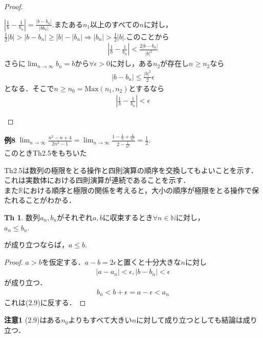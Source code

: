 \documentclass{ltjsarticle}
\theoremstyle{definition}
\newtheorem{thm}{Th}[subsection]
\theoremstyle{propcorollarystyle}
\theoremstyle{thmcorollarystyle}
\begin{document}
\begin{proof}
\begin{enumerate}[label={\arabic*}),itemsep=1em]
    $|\frac{1}{b}-\frac{1}{b_n}|=\frac{|b-b_n|}{|bb_n|}.$またある$n_1$以上のすべての$n$に対し，
    $\frac{1}{2}|b|>|b-b_n| \ge |b|-|b_n| \Rightarrow |b_n| > \frac{1}{2}|b|.$このことから
    \begin{align*}
      |\frac{1}{b}-\frac{1}{b_n}|<\frac{2|b-b_n|}{|b|^2}
    \end{align*} 
    さらに$\lim_{n \rightarrow \infty} b_n=b$から$\forall \epsilon>0$に対し，ある$n_2$が存在し$n \ge n_2$なら
    \begin{align*}
      |b-b_n| \le \frac{|b|^2}{2}\epsilon
    \end{align*}
    となる．そこで$n \ge n_0=\text{Max}{(n_1,n_2)}$とするなら
    \begin{align*}
      |\frac{1}{b}-\frac{1}{b_n}|<\epsilon
    \end{align*}
  \end{enumerate}
\end{proof}

\textbf{例8} $\lim_{n \rightarrow \infty} \frac{n^2 -n+4}{2n^2 -1}=
\lim_{n \rightarrow \infty} \frac{1-\frac{1}{n}+\frac{4}{n^2}}{2-\frac{1}{n^2}}=\frac{1}{2}.$\\
このときTh2.5をもちいた

Th2.5は数列の極限をとる操作と四則演算の順序を交換してもよいことを示す．これは実数体における四則演算が連続であることを示す．\\
また$\mathbb{R}$における順序と極限の関係を考えると，大小の順序が極限をとる操作で保たれることがわかる．

\begin{thm}
  数列$a_n,b_n$がそれぞれ$a,b$に収束するとき$\forall n \in \mathbb{N}$に対し，\\
  \hfil
  $a_n \le b_n$.
  \hfil\par
  が成り立つならば，$a\le b.$
\end{thm}
\begin{proof}
  $a>b$を仮定する．$a-b=2\epsilon$と置くと十分大きな$n$に対し
  \begin{align*}
    |a-a_n|<\epsilon,|b-b_n|<\epsilon
  \end{align*}
  が成り立つ．
  \begin{align*}
    b_n<b+\epsilon=a-\epsilon<a_n
  \end{align*}
  これは(2.9)に反する．
\end{proof}

\textbf{注意1} (2.9)はある$n_0$よりもすべて大きい$n$に対して成り立つとしても結論は成り立つ．
\end{document}
